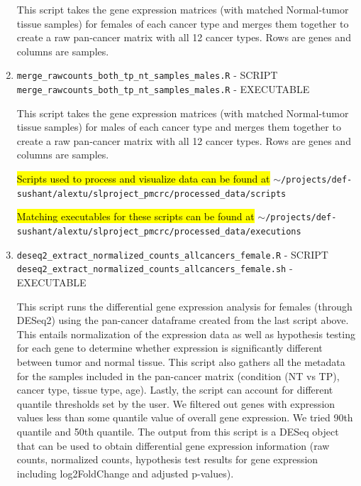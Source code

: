 \documentclass[10pt]{article}
\begin{document}
\begin{enumerate}
This script takes the gene expression matrices (with matched Normal-tumor tissue samples) for females of each cancer type and merges them together to create a raw pan-cancer matrix with all 12 cancer types. Rows are genes and columns are samples.

\item\texttt{merge\_rawcounts\_both\_tp\_nt\_samples\_males.R} - SCRIPT \newline
\texttt{merge\_rawcounts\_both\_tp\_nt\_samples\_males.R} - EXECUTABLE

This script takes the gene expression matrices (with matched Normal-tumor tissue samples) for males of each cancer type and merges them together to create a raw pan-cancer matrix with all 12 cancer types. Rows are genes and columns are samples.

\hl{Scripts used to process and visualize data can be found at} \texttt{$\sim$/projects/def-sushant/alextu/\newline slproject\_pmcrc/processed\_data/scripts}

\hl{Matching executables for these scripts can be found at}
\texttt{$\sim$/projects/def-sushant/alextu/\newline slproject\_pmcrc/processed\_data/executions}


\item\texttt{deseq2\_extract\_normalized\_counts\_allcancers\_female.R} - SCRIPT\newline
\texttt{deseq2\_extract\_normalized\_counts\_allcancers\_female.sh} - EXECUTABLE
	
This script runs the differential gene expression analysis for females (through DESeq2) using the pan-cancer dataframe created from the last script above. This entails normalization of the expression data as well as hypothesis testing for each gene to determine whether expression is significantly different between tumor and normal tissue. This script also gathers all the metadata for the samples included in the pan-cancer matrix (condition (NT vs TP), cancer type, tissue type, age). Lastly, the script can account for different quantile thresholds set by the user. We filtered out genes with expression values less than some quantile value of overall gene expression. We tried 90th quantile and 50th quantile. The output from this script is a DESeq object that can be used to obtain differential gene expression information (raw counts, normalized counts, hypothesis test results for gene expression including log2FoldChange and adjusted p-values).
	

\end{enumerate}
\end{document}

